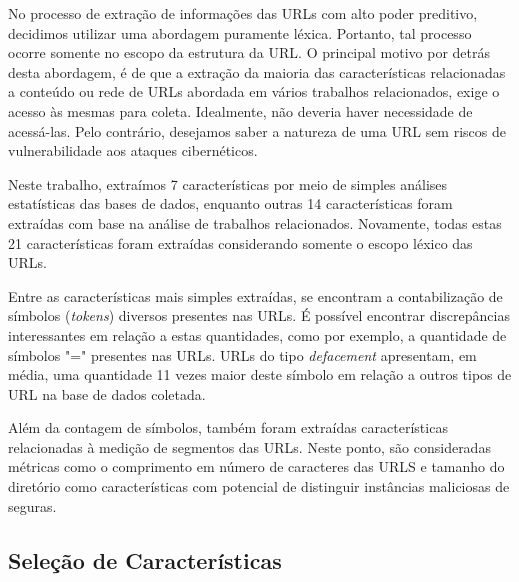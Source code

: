 \documentclass[manuscript,screen,review]{acmart}
\begin{document}
No processo de extração de informações das URLs com alto poder preditivo, decidimos utilizar uma abordagem puramente léxica. Portanto, tal processo ocorre somente no escopo da estrutura da URL. O principal motivo por detrás desta abordagem, é de que a extração da maioria das características relacionadas a conteúdo ou rede de URLs abordada em vários trabalhos relacionados, exige o acesso às mesmas para coleta. Idealmente, não deveria haver necessidade de acessá-las. Pelo contrário, desejamos saber a natureza de uma URL sem riscos de vulnerabilidade aos ataques cibernéticos.

Neste trabalho, extraímos 7 características por meio de simples análises estatísticas das bases de dados, enquanto outras 14 características foram extraídas com base na análise de trabalhos relacionados. Novamente, todas estas 21 características foram extraídas considerando somente o escopo léxico das URLs.

Entre as características mais simples extraídas, se encontram a contabilização de símbolos (\emph{tokens}) diversos presentes nas URLs. É possível encontrar discrepâncias interessantes em relação a estas quantidades, como por exemplo, a quantidade de símbolos "=" \hspace{0.1cm}presentes nas URLs. URLs do tipo \emph{defacement} apresentam, em média, uma quantidade 11 vezes maior deste símbolo em relação a outros tipos de URL na base de dados coletada.

Além da contagem de símbolos, também foram extraídas características relacionadas à medição de segmentos das URLs. Neste ponto, são consideradas métricas como o comprimento em número de caracteres das URLS e tamanho do diretório como características com potencial de distinguir instâncias maliciosas de seguras.

\subsection{Seleção de Características}
\end{document}
